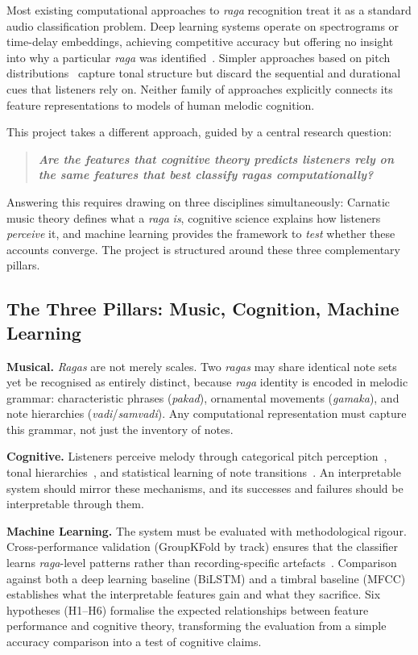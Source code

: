 \documentclass[11pt,a4paper]{article}
\begin{document}
{Most existing computational approaches to \textit{raga} recognition treat it as a standard audio classification problem. Deep learning systems operate on spectrograms or time-delay embeddings, achieving competitive accuracy but offering no insight into why a particular \textit{raga} was identified~\cite{gulati2016}. Simpler approaches based on pitch distributions~\cite{koduri2012} capture tonal structure but discard the sequential and durational cues that listeners rely on. Neither family of approaches explicitly connects its feature representations to models of human melodic cognition.

This project takes a different approach, guided by a central research question:

\begin{quote}
\textbf{\textit{Are the features that cognitive theory predicts listeners rely on the same features that best classify \textit{ragas} computationally?}}
\end{quote}

\noindent Answering this requires drawing on three disciplines simultaneously: Carnatic music theory defines what a \textit{raga} \textit{is}, cognitive science explains how listeners \textit{perceive} it, and machine learning provides the framework to \textit{test} whether these accounts converge. The project is structured around these three complementary pillars.

\subsection{The Three Pillars: Music, Cognition, Machine Learning}

\textbf{Musical.} \textit{Ragas} are not merely scales. Two \textit{ragas} may share identical note sets yet be recognised as entirely distinct, because \textit{raga} identity is encoded in melodic grammar: characteristic phrases (\textit{pakad}), ornamental movements (\textit{gamaka}), and note hierarchies (\textit{vadi}/\textit{samvadi}). Any computational representation must capture this grammar, not just the inventory of notes.

\textbf{Cognitive.} Listeners perceive melody through categorical pitch perception~\cite{burns1978}, tonal hierarchies~\cite{castellano1984}, and statistical learning of note transitions~\cite{tillmann2000}. An interpretable system should mirror these mechanisms, and its successes and failures should be interpretable through them.

\textbf{Machine Learning.} The system must be evaluated with methodological rigour. Cross-performance validation (GroupKFold by track) ensures that the classifier learns \textit{raga}-level patterns rather than recording-specific artefacts~\cite{sturm2014}. Comparison against both a deep learning baseline (BiLSTM) and a timbral baseline (MFCC) establishes what the interpretable features gain and what they sacrifice. Six hypotheses (H1--H6) formalise the expected relationships between feature performance and cognitive theory, transforming the evaluation from a simple accuracy comparison into a test of cognitive claims.

}
\end{document}
